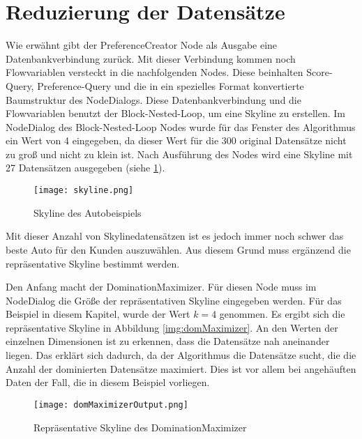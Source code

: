 \section{Reduzierung der Datensätze}
\label{ch:Evaluierung:sec:repSkyline}
Wie erwähnt gibt der PreferenceCreator Node als Ausgabe eine Datenbankverbindung zurück. Mit dieser Verbindung kommen noch Flowvariablen versteckt in die nachfolgenden Nodes. Diese beinhalten Score-Query, Preference-Query und die in ein spezielles Format konvertierte Baumstruktur des NodeDialogs. Diese Datenbankverbindung und die Flowvariablen benutzt der Block-Nested-Loop, um eine Skyline zu erstellen. Im NodeDialog des Block-Nested-Loop Nodes wurde für das Fenster des Algorithmus ein Wert von 4 eingegeben, da dieser Wert für die 300 original Datensätze  nicht zu groß und nicht zu klein ist. Nach Ausführung des Nodes wird eine Skyline mit 27 Datensätzen ausgegeben (siehe \ref{img:skyline}). 

\begin{figure}[H]
	\centering
	\texttt{[image: skyline.png]}
	\caption{Skyline des Autobeispiels}
	\label{img:skyline}
\end{figure} 

Mit dieser Anzahl von Skylinedatensätzen ist es jedoch immer noch schwer das beste Auto für den Kunden auszuwählen. Aus diesem Grund muss ergänzend die repräsentative Skyline bestimmt werden.

Den Anfang macht der DominationMaximizer. Für diesen Node muss im NodeDialog die Größe der repräsentativen Skyline eingegeben werden. Für das Beispiel in diesem Kapitel, wurde der Wert $k=4$ genommen. Es ergibt sich die repräsentative Skyline in Abbildung \ref{img:domMaximizer}. An den Werten der einzelnen Dimensionen ist zu erkennen, dass die Datensätze nah aneinander liegen. Das erklärt sich dadurch, da der Algorithmus die Datensätze sucht, die die Anzahl der dominierten Datensätze maximiert. Dies ist vor allem bei angehäuften Daten der Fall, die in diesem Beispiel vorliegen.

\begin{figure}[H]
	\centering
	\texttt{[image: domMaximizerOutput.png]}
	\caption{Repräsentative Skyline des DominationMaximizer}
	\label{img:domMaximizerOutput}
\end{figure} 


